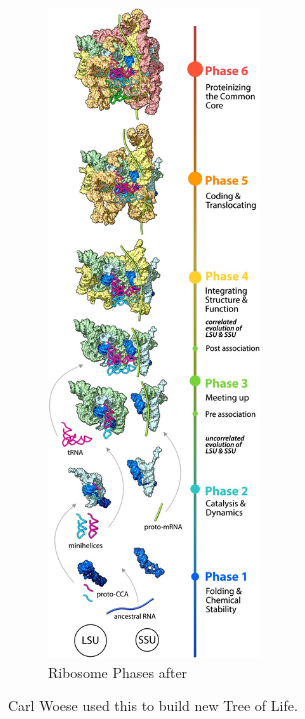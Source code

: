 \documentclass[]{article}
\begin{document}
\begin{figure}[H]
	\caption{Ribosome Phases after \cite{petrov2015history}}\label{fig:RibosomePhases} 
	\includegraphics[width=0.5\textwidth]{RibosomePhases}
\end{figure}

Carl Woese used this to build new Tree of Life.
\end{document}
